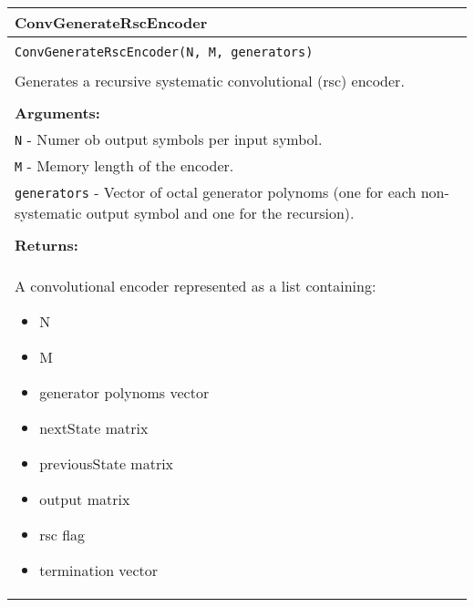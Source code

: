 \begin{longtable}{|p{\textwidth}|}
\hline
\rowcolor{lightblue}ConvGenerateRscEncoder\\
\hline
\\
\texttt{ConvGenerateRscEncoder(N, M, generators)}\\
\\
Generates a recursive systematic convolutional (rsc) encoder.\\
\\
\textbf{Arguments:}\\
\texttt{N} - Numer ob output symbols per input symbol.\\
\texttt{M} - Memory length of the encoder.\\
\texttt{generators} - Vector of octal generator polynoms (one for each non-systematic output symbol and one for the recursion).\\
\\
\textbf{Returns:}\\
A convolutional encoder represented as a list containing:
\vspace{-4mm}
\begin{itemize}
\renewcommand\labelitemi{--}
\itemsep-.5em %
\item N
\item M
\item generator polynoms vector
\item nextState matrix
\item previousState matrix
\item output matrix
\item rsc flag
\item termination vector
\end{itemize}
\\
\hline
\end{longtable}